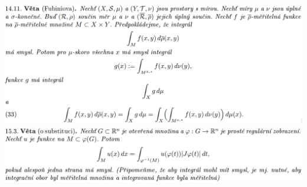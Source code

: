 \documentclass[12pt,a4paper]{article}
\begin{document}
\begin{center}
		\includegraphics[width=\textwidth]{img/1lebInt/2020-06-20 18 00 19.png}\vspace{0.3cm}
		\includegraphics[width=\textwidth]{img/1lebInt/2020-06-20 18 00 36.png}\vspace{0.3cm}
	\end{center}
\end{document}
